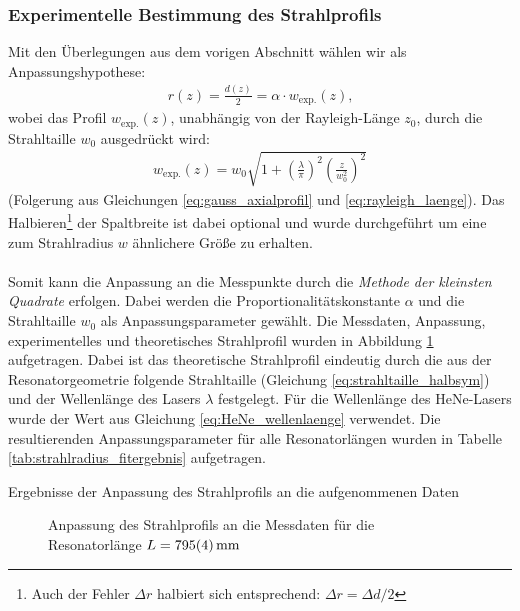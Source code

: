 \documentclass[11pt, a4paper]{article}
\numberwithin{equation}{section}
\begin{document}
\subsubsection{Experimentelle Bestimmung des Strahlprofils}
Mit den Überlegungen aus dem vorigen Abschnitt wählen wir als Anpassungshypothese:
\begin{align}
	 r(z) = \frac{d(z)}{2} = \alpha \cdot w_\mathrm{exp.}(z) \text{,}
\end{align}
wobei das Profil $w_\mathrm{exp.}(z)$, unabhängig von der Rayleigh-Länge $z_0$, durch die Strahltaille $w_0$ ausgedrückt wird:
\begin{align}
	w_\mathrm{exp.}(z) = w_0 \sqrt{1 + \left( \frac{\lambda}{\pi} \right)^2 \left( \frac{z}{w_0^2}\right)^2}
\end{align}
(Folgerung aus Gleichungen \ref{eq:gauss_axialprofil} und \ref{eq:rayleigh_laenge}).
Das Halbieren\footnote{Auch der Fehler $\Delta r$ halbiert sich entsprechend: $\Delta r = \Delta d / 2$} der Spaltbreite ist dabei optional und wurde durchgeführt um eine zum Strahlradius $w$ ähnlichere Größe zu erhalten.\\
\\
Somit kann die Anpassung an die Messpunkte durch die \emph{Methode der kleinsten Quadrate} erfolgen.
Dabei werden die Proportionalitätskonstante $\alpha$ und die Strahltaille $w_0$ als Anpassungsparameter gewählt.
Die Messdaten, Anpassung, experimentelles und theoretisches Strahlprofil wurden in Abbildung \ref{fig:ex_strahlradius} aufgetragen.
Dabei ist das theoretische Strahlprofil eindeutig durch die aus der Resonatorgeometrie folgende Strahltaille (Gleichung \ref{eq:strahltaille_halbsym}) und der Wellenlänge des Lasers $\lambda$ festgelegt.
Für die Wellenlänge des HeNe-Lasers wurde der Wert aus Gleichung \ref{eq:HeNe_wellenlaenge} verwendet.
Die resultierenden Anpassungsparameter für alle Resonatorlängen wurden in Tabelle \ref{tab:strahlradius_fitergebnis} aufgetragen.
\begin{table}[h]
	\centering
	
	\caption{Ergebnisse der Anpassung des Strahlprofils an die aufgenommenen Daten}
	\label{tab:strahlradius_fitergebnis}
\end{table}
\begin{figure}[h]
	\centering
	
	\caption{Anpassung des Strahlprofils an die Messdaten für die Resonatorlänge $L = \SI{795 +- 4}{\milli\metre}$}
	\label{fig:ex_strahlradius}
\end{figure}
\end{document}
